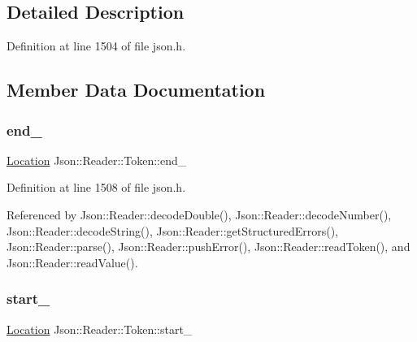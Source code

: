 \subsection{Detailed Description}


Definition at line 1504 of file json.\+h.



\subsection{Member Data Documentation}
\mbox{\label{class_json_1_1_reader_1_1_token_a7d3bc0fa40097f435d184be4b1fd5ae1}} 
\subsubsection{\texorpdfstring{end\+\_\+}{end\_}}
{\footnotesize\ttfamily \hyperlink{class_json_1_1_reader_a46795b5b272bf79a7730e406cb96375a}{Location} Json\+::\+Reader\+::\+Token\+::end\+\_\+}



Definition at line 1508 of file json.\+h.



Referenced by Json\+::\+Reader\+::decode\+Double(), Json\+::\+Reader\+::decode\+Number(), Json\+::\+Reader\+::decode\+String(), Json\+::\+Reader\+::get\+Structured\+Errors(), Json\+::\+Reader\+::parse(), Json\+::\+Reader\+::push\+Error(), Json\+::\+Reader\+::read\+Token(), and Json\+::\+Reader\+::read\+Value().

\mbox{\label{class_json_1_1_reader_1_1_token_aff87d677b9ac4b52542a00b0d6673249}} 
\subsubsection{\texorpdfstring{start\+\_\+}{start\_}}
{\footnotesize\ttfamily \hyperlink{class_json_1_1_reader_a46795b5b272bf79a7730e406cb96375a}{Location} Json\+::\+Reader\+::\+Token\+::start\+\_\+}



